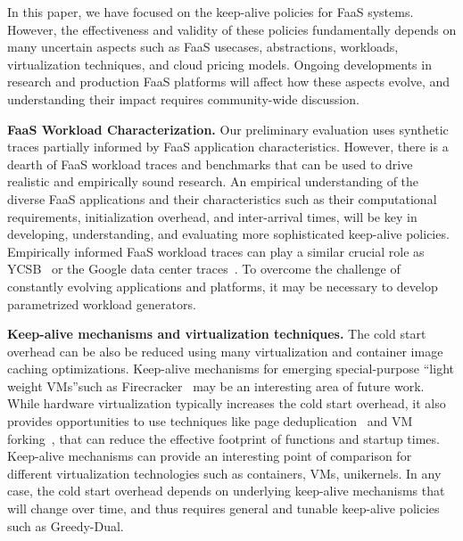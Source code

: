 
In this paper, we have focused on the keep-alive policies for FaaS systems.
%
However, the effectiveness and validity of these policies fundamentally depends on many uncertain aspects such as  FaaS usecases, abstractions, workloads, virtualization techniques, and cloud pricing models. 
%
Ongoing developments in research and production FaaS platforms will affect how these aspects evolve, and understanding their impact requires community-wide discussion. 



\noindent \textbf{FaaS Workload Characterization.}
Our preliminary evaluation uses synthetic traces partially informed by FaaS application characteristics. 
However, there is a dearth of FaaS workload traces and benchmarks that can be used to drive realistic and empirically sound research. 
An empirical understanding of the diverse FaaS applications and their characteristics such as their computational requirements, initialization overhead, and inter-arrival times, will be key in developing, understanding, and evaluating more sophisticated keep-alive policies. 
Empirically informed FaaS workload traces can play a similar crucial role as YCSB~\cite{ycsb-socc2010} or the Google data center traces~\cite{clusterdata:Reiss2011}. 
To overcome the challenge of constantly evolving applications and platforms, it may be necessary to develop parametrized workload generators. 



\noindent \textbf{Keep-alive mechanisms and virtualization techniques.}
The cold start overhead can be also be reduced using  many virtualization and container image caching optimizations. 
Keep-alive mechanisms for emerging special-purpose ``light weight VMs''such as Firecracker~\cite{firecracker-nsdi20} may be an interesting area of future work. 
While hardware virtualization typically increases the cold start overhead, it also provides opportunities to use techniques like page deduplication~\cite{sharma2012singleton} and VM forking~\cite{lagar2011snowflock}, that can reduce the effective footprint of functions and startup times.
Keep-alive mechanisms can provide an interesting point of comparison for different virtualization technologies such as containers, VMs, unikernels.
In any case, the cold start overhead depends on underlying keep-alive mechanisms that will change over time, and thus requires general and tunable keep-alive policies such as Greedy-Dual. 




